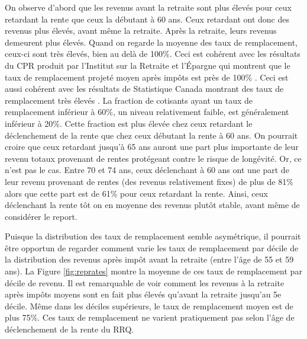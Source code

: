 \documentclass[french, 12pt]{article}
\begin{document}
	On observe d'abord que les revenus avant la retraite sont plus élevés pour ceux retardant la rente que ceux la débutant à 60 ans. Ceux retardant ont donc des revenus plus élevés, avant même la retraite. Après la retraite, leurs revenus demeurent plus élevés. Quand on regarde la moyenne des taux de remplacement, ceux-ci sont très élevés, bien au delà de 100\%. Ceci est cohérent avec les résultats du CPR produit par l'Institut sur la Retraite et l'Épargne qui montrent que le taux de remplacement projeté moyen après impôts est près de 100\% \citep{ire2020}. Ceci est aussi cohérent avec les résultats de Statistique Canada montrant des taux de remplacement très élevés \citep{ostrovsky2010}. La fraction de cotisants ayant un taux de remplacement inférieur à 60\%, un niveau relativement faible, est généralement inférieur à 20\%. Cette fraction est plus élevée chez ceux retardant le déclenchement de la rente que chez ceux débutant la rente à 60 ans. On pourrait croire que ceux retardant jusqu'à 65 ans auront une part plus importante de leur revenu totaux provenant de rentes protégeant contre le risque de longévité. Or, ce n'est pas le cas. Entre 70 et 74 ans, ceux déclenchant à 60 ans ont une part de leur revenu provenant de rentes (des revenus relativement fixes) de plus de 81\% alors que cette part est de 61\% pour ceux retardant la rente. Ainsi, ceux déclenchant la rente tôt on en moyenne des revenus plutôt stable, avant même de considérer le report. 
	
	
	
	Puisque la distribution des taux de remplacement semble asymétrique, il pourrait être opportun de regarder comment varie les taux de remplacement par décile de la distribution des revenus après impôt avant la retraite (entre l'âge de 55 et 59 ans). La Figure \ref{fig:reprates} montre la moyenne de ces taux de remplacement par décile de revenu. Il est remarquable de voir comment les revenus à la retraite après impôts moyens sont en fait plus élevés qu'avant la retraite jusqu'au 5e décile. Même dans les déciles supérieurs, le taux de remplacement moyen est de plus 75\%. Ces taux de remplacement ne varient pratiquement pas selon l'âge de déclenchement de la rente du RRQ.  
	
\end{document}
